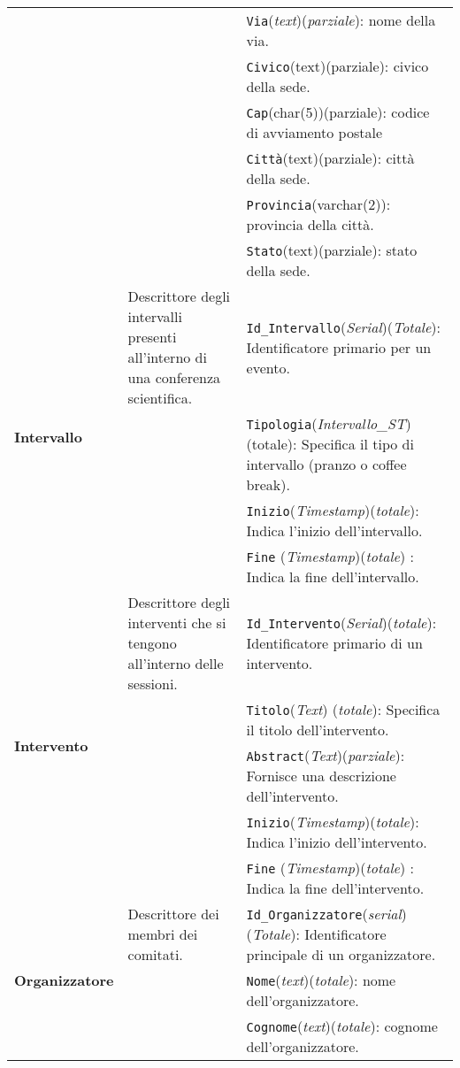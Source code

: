 \begin{longtable}{|p{}|p{}|p{}|}
	& & \texttt{Via}(\textit{text})(\textit{parziale}): nome della via. \\
	& & \texttt{Civico}(text)(parziale): civico della sede. \\
	& & \texttt{Cap}(char(5))(parziale): codice di avviamento postale \\
	& & \texttt{Città}(text)(parziale): città della sede. \\
	& & \texttt{Provincia}(varchar(2)): provincia della città. \\
	& & \texttt{Stato}(text)(parziale): stato della sede. \\ 
	\hline
	\multirow{4}{*}{\textbf{Intervallo}} & Descrittore degli intervalli presenti all'interno di una conferenza scientifica.&  \texttt{Id\_Intervallo}(\textit{Serial})(\textit{Totale}): Identificatore primario per un evento. \\
	& & \texttt{Tipologia}(\textit{Intervallo\_ST})(totale): Specifica il tipo di intervallo (pranzo o coffee break).  \\
	& & \texttt{Inizio}(\textit{Timestamp})(\textit{totale}): Indica l'inizio dell'intervallo. \\
	& & \texttt{Fine} (\textit{Timestamp})(\textit{totale}) : Indica la fine dell'intervallo. \\
	\hline
	\multirow{5}{*}{\textbf{Intervento}} & Descrittore degli interventi che si tengono all'interno delle sessioni. & \texttt{Id\_Intervento}(\textit{Serial})(\textit{totale}): Identificatore primario di un intervento. \\
	& & \texttt{Titolo}(\textit{Text}) (\textit{totale}): Specifica il titolo dell'intervento. \\
	& & \texttt{Abstract}(\textit{Text})(\textit{parziale}): Fornisce una descrizione dell'intervento. \\
	& & \texttt{Inizio}(\textit{Timestamp})(\textit{totale}): Indica l'inizio dell'intervento. \\
	& & \texttt{Fine} (\textit{Timestamp})(\textit{totale}) : Indica la fine dell'intervento. \\
	\hline
	\multirow{5}{*}{\textbf{Organizzatore}} & Descrittore dei membri dei comitati. & \texttt{Id\_Organizzatore}(\textit{serial})(\textit{Totale}): Identificatore principale di un organizzatore. \\
	& & \texttt{Nome}(\textit{text})(\textit{totale}): nome dell'organizzatore. \\
	& & \texttt{Cognome}(\textit{text})(\textit{totale}): cognome dell'organizzatore. \\

\end{longtable}
